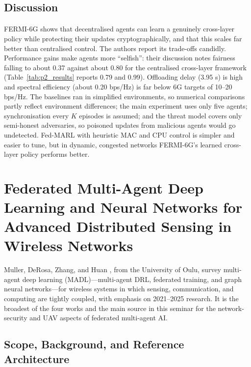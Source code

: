 \documentclass[12pt,a4paper,final]{extreport}
\begin{document}
\subsection{Discussion}

\paragraph{} FERMI-6G shows that decentralised agents can learn a genuinely cross-layer policy while protecting their updates cryptographically, and that this scales far better than centralised control. The authors report its trade-offs candidly. Performance gains make agents more ``selfish'': their discussion notes fairness falling to about 0.37 against about 0.80 for the centralised cross-layer framework (Table~\ref{tab:p2_results} reports 0.79 and 0.99). Offloading delay (3.95 s) is high and spectral efficiency (about 0.20 bps/Hz) is far below 6G targets of 10--20 bps/Hz. The baselines ran in simplified environments, so numerical comparisons partly reflect environment differences; the main experiment uses only five agents; synchronisation every $K$ episodes is assumed; and the threat model covers only semi-honest adversaries, so poisoned updates from malicious agents would go undetected. Fed-MARL with heuristic MAC and CPU control is simpler and easier to tune, but in dynamic, congested networks FERMI-6G's learned cross-layer policy performs better.

\section{Federated Multi-Agent Deep Learning and Neural Networks for Advanced Distributed Sensing in Wireless Networks}

\paragraph{} Muller, DeRosa, Zhang, and Huan \cite{p3}, from the University of Oulu, survey multi-agent deep learning (MADL)---multi-agent DRL, federated training, and graph neural networks---for wireless systems in which sensing, communication, and computing are tightly coupled, with emphasis on 2021--2025 research. It is the broadest of the four works and the main source in this seminar for the network-security and UAV aspects of federated multi-agent AI.

\subsection{Scope, Background, and Reference Architecture}
\end{document}
